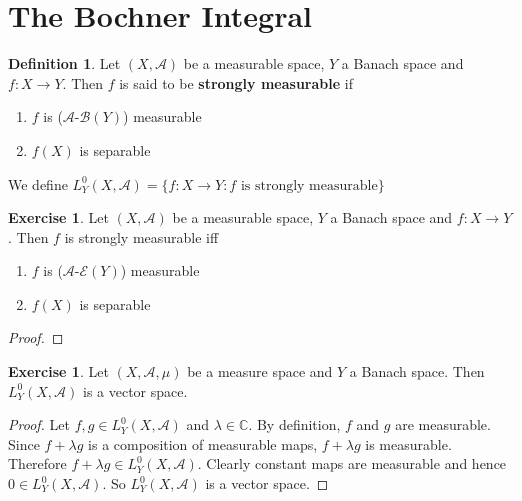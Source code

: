 \documentclass{book}
\theoremstyle{definition}
\newtheorem{defn}[definition]{Definition}
\newtheorem{ex}[definition]{Exercise}
\newcommand{\lam}{\lambda}
\newcommand{\C}{\mathbb{C}}
\newcommand{\MA}{\mathcal{A}}
\newcommand{\MB}{\mathcal{B}}
\newcommand{\ME}{\mathcal{E}}
\newcommand{\lex}[1]{\label{ex:#1}}
\DeclareMathOperator*{\0}{\mbf{0}}
\DeclareMathOperator*{\1}{\mbf{1}}
\begin{document}
	
	
	
	
	
	
	
	
	
	
	
	
	
	
	
	
	
	
	
	
	
	
	
	
	\newpage
	\section{The Bochner Integral}
	
	\begin{defn}
		Let $(X, \MA)$ be a measurable space, $Y$ a Banach space and $f:X \rightarrow Y$. Then $f$ is said to be \textbf{strongly measurable} if 
		\begin{enumerate}
			\item $f$ is ($\MA$-$\MB(Y)$) measurable
			\item $f(X)$ is separable
		\end{enumerate}
		We define $L^0_Y(X, \MA) = \{f:X \rightarrow Y: f \text{ is strongly measurable}\}$
	\end{defn}

	\begin{ex}
		Let $(X, \MA)$ be a measurable space, $Y$ a Banach space and $f:X \rightarrow Y$. Then $f$ is strongly measurable iff 
		\begin{enumerate}
			\item $f$ is ($\MA$-$\ME(Y)$) measurable
			\item $f(X)$ is separable
		\end{enumerate}
	\end{ex}

	\begin{proof}
		
	\end{proof}


	
	\begin{ex} \lex{00000} 
	Let $(X, \MA, \mu)$ be a measure space and $Y$ a Banach space. Then $L_Y^0(X, \MA)$ is a vector space.
	\end{ex}
	
	\begin{proof}
	Let $f, g \in L_Y^0(X, \MA)$ and $\lam \in \C$. By definition, $f$ and $g$ are measurable. Since $f+\lam g $ is a composition of measurable maps, $f + \lam g$ is measurable. Therefore $f + \lam g \in L_Y^0(X, \MA)$. Clearly constant maps are measurable and hence $0 \in L_Y^0(X, \MA)$. So $L_Y^0(X, \MA)$ is a vector space. 
	\end{proof}
\end{document}
